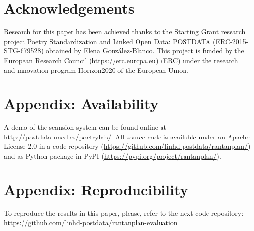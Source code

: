 \documentclass[a4paper,11pt,twocolumn,twoside]{article}
\begin{document}
\section*{Acknowledgements}
Research for this paper has been achieved thanks to the Starting Grant research project Poetry Standardization and Linked Open Data: POSTDATA (ERC-2015-STG-679528) obtained by Elena González-Blanco. This project is funded by the European Research Council (https://erc.europa.eu) (ERC) under the research and innovation program Horizon2020 of the European Union.




\section{Appendix: Availability}
A demo of the scansion system can be found online at \url{http://postdata.uned.es/poetrylab/}. All source code is available under an Apache License 2.0 in a code repository (\url{https://github.com/linhd-postdata/rantanplan/}) and as Python package in PyPI (\url{https://pypi.org/project/rantanplan/}).

\section{Appendix: Reproducibility}
To reproduce the results in this paper, please, refer to the next code repository: \url{https://github.com/linhd-postdata/rantanplan-evaluation}
\end{document}
